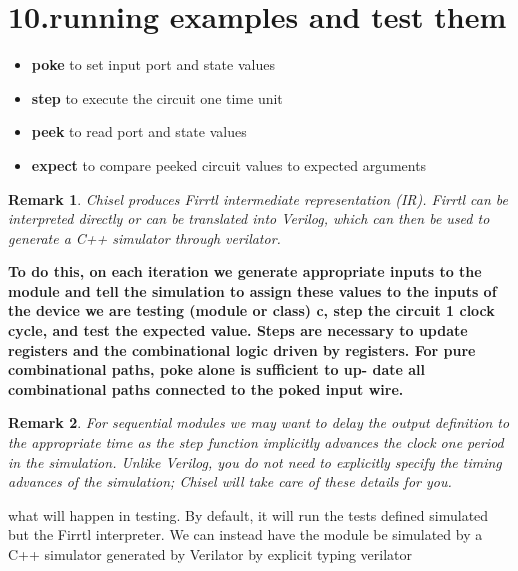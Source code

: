 \documentclass[11pt]{article}
\newtheorem*{remark}{Remark}
\begin{document}
\section*{10.running examples and test them}
\begin{itemize}
	\item \textbf{poke} to set input port and state values
	\item \textbf{step} to execute the circuit one time unit
	\item \textbf{peek} to read port and state values
	\item \textbf{expect} to compare peeked circuit values to expected arguments
\end{itemize}
\begin{remark}
	Chisel produces Firrtl intermediate representation
	(IR). Firrtl can be interpreted directly or can be
	translated into Verilog, which can then be used to
	generate a C++ simulator through verilator.
\end{remark}
\textbf{To do this,
	on each iteration we generate appropriate inputs to
	the module and tell the simulation to assign these
	values to the inputs of the device we are testing (module or class) c,
	step the circuit 1 clock cycle, and test the expected
	value. Steps are necessary to update registers and
	the combinational logic driven by registers. For pure
	combinational paths, poke alone is sufficient to up-
	date all combinational paths connected to the poked
	input wire.
}
\begin{remark}
	For sequential modules we may want to delay the output definition to the appropriate time as the step function implicitly advances the clock one period in the simulation. Unlike Verilog, you do not need to explicitly specify the timing advances of the simulation; Chisel will take care of these details for you.
\end{remark}
what will happen in testing. By default, it will run the tests defined simulated but the Firrtl interpreter. We can instead have the module be simulated by a C++ simulator generated by Verilator by explicit typing verilator 
\end{document}
